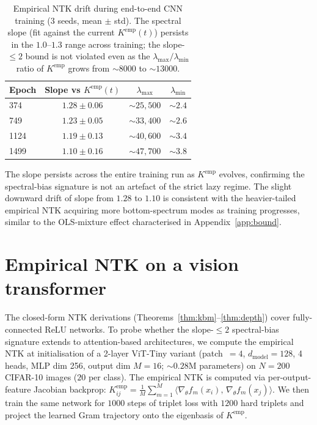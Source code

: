 \documentclass{article}
\begin{document}
\begin{table}[!htbp]
\centering
\small
\caption{Empirical NTK drift during end-to-end CNN training (3 seeds,
mean $\pm$ std). The spectral slope (fit against the current
$K^{\mathrm{emp}}(t)$) persists in the $1.0$--$1.3$ range across
training; the slope-$\leq 2$ bound is not violated even as the
$\lambda_{\max}/\lambda_{\min}$ ratio of $K^{\mathrm{emp}}$ grows from
$\sim$$8000$ to $\sim$$13000$.}
\label{tab:drift}
\begin{tabular}{lccc}
\toprule
Epoch & Slope vs $K^{\mathrm{emp}}(t)$ & $\lambda_{\max}$ & $\lambda_{\min}$ \\
\midrule
374  & $1.28 \pm 0.06$ & $\sim 25{,}500$ & $\sim 2.4$ \\
749  & $1.23 \pm 0.05$ & $\sim 33{,}400$ & $\sim 2.6$ \\
1124 & $1.19 \pm 0.13$ & $\sim 40{,}600$ & $\sim 3.4$ \\
1499 & $1.10 \pm 0.16$ & $\sim 47{,}700$ & $\sim 3.8$ \\
\bottomrule
\end{tabular}
\end{table}

The slope persists across the entire training run as $K^{\mathrm{emp}}$
evolves, confirming the spectral-bias signature is not an artefact of
the strict lazy regime. The slight downward drift of slope from $1.28$
to $1.10$ is consistent with the heavier-tailed empirical NTK
acquiring more bottom-spectrum modes as training progresses, similar
to the OLS-mixture effect characterised in Appendix~\ref{app:bound}.

\section{Empirical NTK on a vision transformer}
\label{app:vit}

The closed-form NTK derivations
(Theorems~\ref{thm:kbm}--\ref{thm:depth}) cover fully-connected ReLU
networks. To probe whether the slope-$\le 2$ spectral-bias signature
extends to attention-based architectures, we compute the empirical NTK
at initialisation of a 2-layer ViT-Tiny variant
(patch~$=4$, $d_{\mathrm{model}}=128$, 4 heads, MLP dim 256, output
dim $M=16$; $\sim 0.28$M parameters) on $N=200$ CIFAR-10 images
($20$ per class). The empirical NTK is computed via
per-output-feature Jacobian backprop:
$K^{\mathrm{emp}}_{ij} = \frac{1}{M}\sum_{m=1}^{M}
\langle \nabla_\theta f_m(x_i),\, \nabla_\theta f_m(x_j)\rangle$.
We then train the same network for $1000$ steps of triplet loss with
$1200$ hard triplets and project the learned Gram trajectory onto the
eigenbasis of $K^{\mathrm{emp}}$.
\end{document}
